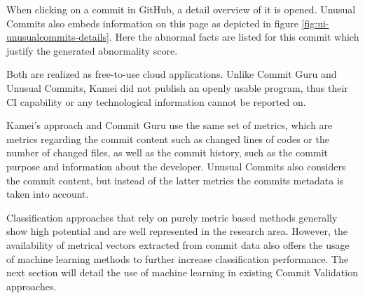 When clicking on a commit in GitHub, a detail overview of it is opened. Unusual Commits also embeds information on this page as depicted in figure \ref{fig:ui-unusualcommits-details}. Here the abnormal facts are listed for this commit which justify the generated abnormality score.

Both are realized as free-to-use cloud applications.
Unlike Commit Guru and Unusual Commits, Kamei did not publish an openly usable program, thus their CI capability or any technological information cannot be reported on.

Kamei's approach and Commit Guru use the same set of metrics, which are metrics regarding the commit content such as changed lines of codes or the number of changed files, as well as the commit history, such as the commit purpose and information about the developer. Unusual Commits also considers the commit content, but instead of the latter metrics the commits metadata is taken into account.

Classification approaches that rely on purely metric based methods generally show high potential and are well represented in the research area. However, the availability of metrical vectors extracted from commit data also offers the usage of machine learning methods to further increase classification performance. The next section will detail the use of machine learning in existing Commit Validation approaches.


